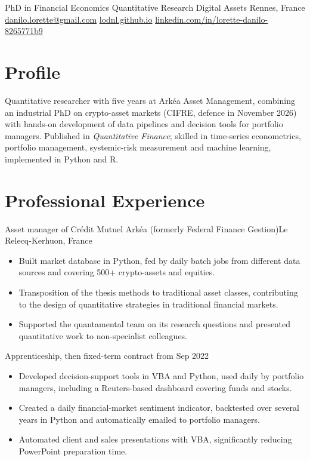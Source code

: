 \documentclass[10pt]{article}
\begin{document}
  {PhD in Financial Economics \textperiodcentered{} Quantitative Research \textperiodcentered{} Digital Assets}
  {Rennes, France \quad\textbar\quad
   \href{mailto:danilo.lorette@gmail.com}{danilo.lorette@gmail.com} \quad\textbar\quad
   \href{https://lodnl.github.io}{lodnl.github.io} \quad\textbar\quad
   \href{https://www.linkedin.com/in/lorette-danilo-8265771b9/}{linkedin.com/in/lorette-danilo-8265771b9}}

\section{Profile}
Quantitative researcher with five years at Arkéa Asset Management, combining an industrial PhD on
crypto-asset markets (CIFRE, defence in November 2026) with hands-on development of data pipelines
and decision tools for portfolio managers. Published in \textit{Quantitative Finance}; skilled in
time-series econometrics, portfolio management, systemic-risk measurement and machine learning, implemented in Python and R.

\section{Professional Experience}

      {Asset manager of Crédit Mutuel Arkéa (formerly Federal Finance Gestion)}{Le Relecq-Kerhuon, France}

\begin{itemize}
  \item Built market database in Python, fed by daily batch jobs from different data sources
        and covering 500+ crypto-assets and equities.
  \item Transposition of the thesis methods 
      to traditional asset classes, contributing to the design of quantitative strategies in traditional financial markets.
  \item Supported the quantamental team on its research questions and presented quantitative work
        to non-specialist colleagues.
\end{itemize}

{\small\color{muted}Apprenticeship, then fixed-term contract from Sep 2022}
\begin{itemize}
  \item Developed decision-support tools in VBA and Python, used daily by portfolio managers,
        including a Reuters-based dashboard covering funds and stocks.
  \item Created a daily financial-market sentiment indicator, backtested over several years in Python 
      and automatically emailed to portfolio managers.
  \item Automated client and sales presentations with VBA, significantly reducing PowerPoint preparation time.
\end{itemize}
\end{document}
